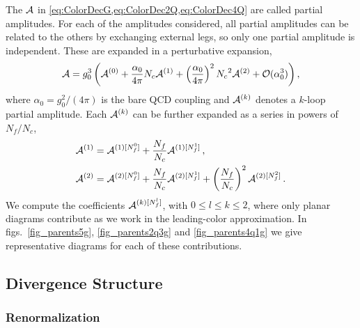 The $\mathcal{A}$ in \cref{eq:ColorDecG,eq:ColorDec2Q,eq:ColorDec4Q} are
called partial amplitudes. For each of the amplitudes considered, all
partial amplitudes can be related to the others by exchanging external
legs, so only one partial amplitude is independent. These are expanded in a perturbative
expansion,
\begin{equation}
    \label{eq:partials} 
    \mathcal{A}
    = g^{3}_0 \left(
        \mathcal{A}^{(0)}
      + \frac{\alpha_0}{4\pi}{N_c} \mathcal{A}^{(1)}
      + \left(\frac{\alpha_0}{4\pi}\right)^2{N_c}^2  \mathcal{A}^{(2)} 
      + \mathcal{O}(\alpha_0^3)
      \right),
\end{equation}
where $\alpha_0=g_0^2/(4\pi)$ is the bare QCD coupling and 
$\mathcal{A}^{(k)}$ denotes a $k$-loop partial amplitude. Each 
$\mathcal{A}^{(k)}$ can be further expanded as a series in powers of 
$N_f/N_c$,
\begin{align}
  \label{eq:nfdecomposition} 
  \begin{split}
  \mathcal{A}^{(1)} &= \mathcal{A}^{(1)[N_f^0]} + 
  \frac{{N_f}}{{N_c}}\mathcal{A}^{(1)[N_f^1]}\,, \\
  \mathcal{A}^{(2)} &= \mathcal{A}^{(2)[N_f^0]} +
  \frac{{N_f}}{{N_c}}\mathcal{A}^{(2)[N_f^1]} +
  \left(\frac{{N_f}}{{N_c}}\right)^2\mathcal{A}^{(2)[N_f^2]}\,.
  \end{split} 
\end{align}
We compute the coefficients $\mathcal{A}^{(k)[N_f^l]}$, with $0\leq l\leq
k\leq2$, where only planar diagrams contribute as we work in the
leading-color approximation. In figs.~\ref{fig_parents5g},
\ref{fig_parents2q3g} and \ref{fig_parents4q1g} we give representative
diagrams for each of these contributions.


\subsection{Divergence Structure}
\label{sec:IR}

\subsubsection{Renormalization}

